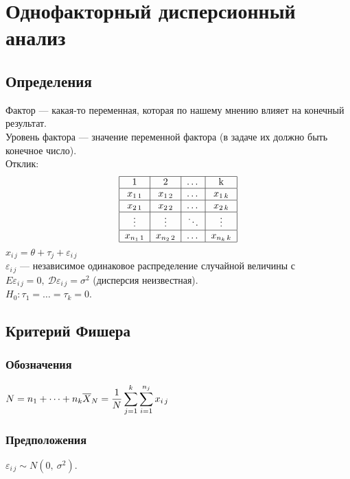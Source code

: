 \documentclass[12pt, a4paper]{article}
\newcommand{\dev}{\mathcal{D}}
\begin{document}
\section*{Однофакторный дисперсионный анализ}
\subsection*{Определения}
Фактор --- какая-то переменная, которая по нашему мнению влияет на конечный результат.\\
Уровень фактора --- значение переменной фактора (в задаче их должно быть конечное число).\\
Отклик:
\[\begin{tabular}{|c|c|c|c|}
    \hline
    1 & 2 & $\dots$ & k\\
    \hline
    $x_{1\, 1}$ & $x_{1\, 2}$ & $\dots$ & $x_{1\, k}$\\
    \hline
    $x_{2\, 1}$ & $x_{2\, 2}$ & $\dots$ & $x_{2\, k}$\\
    \hline
    $\vdots$ & $\vdots$ & $\ddots$ & $\vdots$\\
    \hline
    $x_{{n_1}\, 1}$ & $x_{{n_2}\, 2}$ & $\dots$ & $x_{{n_k}\, k}$\\
    \hline
\end{tabular}\]
$x_{i\, j} = \theta + \tau_j + \varepsilon_{i\, j}$\\
$\varepsilon_{i\, j}$ --- независимое одинаковое распределение случайной величины с $E\varepsilon_{i\, j} = 0,\ \dev \varepsilon_{i\, j} = \sigma^2$ (дисперсия неизвестная).\\
$H_0: \tau_1 = \dots = \tau_k = 0$.
\subsection*{Критерий Фишера}
\subsubsection*{Обозначения}
$N = n_1 + \dots + n_k\\
\overline{X}_N = \displaystyle \frac{1}{N} \sum_{j = 1}^{k} \sum_{i = 1}^{n_j} x_{i\, j}\\$

\subsubsection*{Предположения}
$\varepsilon_{i\, j} \sim N(0,\ \sigma^2)$.
\end{document}
